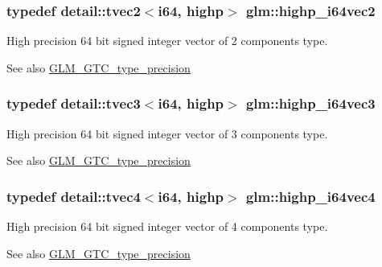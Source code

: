 \subsubsection[{\texorpdfstring{highp\+\_\+i64vec2}{highp_i64vec2}}]{\setlength{\rightskip}{0pt plus 5cm}typedef detail\+::tvec2$<$i64, highp$>$ {\bf glm\+::highp\+\_\+i64vec2}}\hypertarget{group__gtc__type__precision_gabfe3aa6fa4003a47577beb9678ab2661}{}\label{group__gtc__type__precision_gabfe3aa6fa4003a47577beb9678ab2661}
High precision 64 bit signed integer vector of 2 components type. \begin{DoxySeeAlso}{See also}
\hyperlink{group__gtc__type__precision}{G\+L\+M\+\_\+\+G\+T\+C\+\_\+type\+\_\+precision} 
\end{DoxySeeAlso}
\subsubsection[{\texorpdfstring{highp\+\_\+i64vec3}{highp_i64vec3}}]{\setlength{\rightskip}{0pt plus 5cm}typedef detail\+::tvec3$<$i64, highp$>$ {\bf glm\+::highp\+\_\+i64vec3}}\hypertarget{group__gtc__type__precision_ga4030f8ad15da56f5e427aa457d39e888}{}\label{group__gtc__type__precision_ga4030f8ad15da56f5e427aa457d39e888}
High precision 64 bit signed integer vector of 3 components type. \begin{DoxySeeAlso}{See also}
\hyperlink{group__gtc__type__precision}{G\+L\+M\+\_\+\+G\+T\+C\+\_\+type\+\_\+precision} 
\end{DoxySeeAlso}
\subsubsection[{\texorpdfstring{highp\+\_\+i64vec4}{highp_i64vec4}}]{\setlength{\rightskip}{0pt plus 5cm}typedef detail\+::tvec4$<$i64, highp$>$ {\bf glm\+::highp\+\_\+i64vec4}}\hypertarget{group__gtc__type__precision_ga0ea279cd954fbb71a1db62e897d4d7f5}{}\label{group__gtc__type__precision_ga0ea279cd954fbb71a1db62e897d4d7f5}
High precision 64 bit signed integer vector of 4 components type. \begin{DoxySeeAlso}{See also}
\hyperlink{group__gtc__type__precision}{G\+L\+M\+\_\+\+G\+T\+C\+\_\+type\+\_\+precision} 
\end{DoxySeeAlso}
